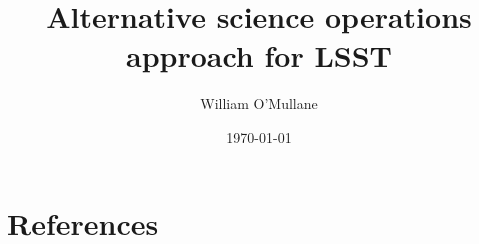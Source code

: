 \documentclass[OPS,authoryear,toc]{lsstdoc}
\title{Alternative science operations approach for  \gls{LSST} }
\author{%
William O'Mullane
}
\date{\today}
\begin{document}

\mkshorttitle




\appendix
\section{References} \label{sec:bib}


\printglossaries
%
\end{document}
